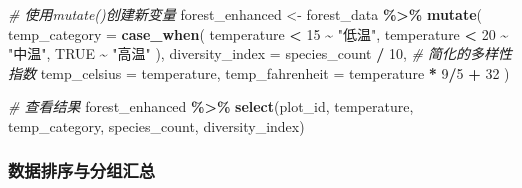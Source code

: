 \documentclass[
]{book}
\newenvironment{Shaded}{\begin{snugshade}}{\end{snugshade}}
\newcommand{\AttributeTok}[1]{\textcolor[rgb]{0.13,0.29,0.53}{#1}}
\newcommand{\CommentTok}[1]{\textcolor[rgb]{0.56,0.35,0.01}{\textit{#1}}}
\newcommand{\ConstantTok}[1]{\textcolor[rgb]{0.56,0.35,0.01}{#1}}
\newcommand{\DecValTok}[1]{\textcolor[rgb]{0.00,0.00,0.81}{#1}}
\newcommand{\FunctionTok}[1]{\textcolor[rgb]{0.13,0.29,0.53}{\textbf{#1}}}
\newcommand{\NormalTok}[1]{#1}
\newcommand{\OtherTok}[1]{\textcolor[rgb]{0.56,0.35,0.01}{#1}}
\newcommand{\SpecialCharTok}[1]{\textcolor[rgb]{0.81,0.36,0.00}{\textbf{#1}}}
\newcommand{\StringTok}[1]{\textcolor[rgb]{0.31,0.60,0.02}{#1}}
\begin{document}
\begin{Shaded}
\begin{Highlighting}[]
\CommentTok{\# 使用mutate()创建新变量}
\NormalTok{forest\_enhanced }\OtherTok{\textless{}{-}}\NormalTok{ forest\_data }\SpecialCharTok{\%\textgreater{}\%}
  \FunctionTok{mutate}\NormalTok{(}
    \AttributeTok{temp\_category =} \FunctionTok{case\_when}\NormalTok{(}
\NormalTok{      temperature }\SpecialCharTok{\textless{}} \DecValTok{15} \SpecialCharTok{\textasciitilde{}} \StringTok{"低温"}\NormalTok{,}
\NormalTok{      temperature }\SpecialCharTok{\textless{}} \DecValTok{20} \SpecialCharTok{\textasciitilde{}} \StringTok{"中温"}\NormalTok{,}
      \ConstantTok{TRUE} \SpecialCharTok{\textasciitilde{}} \StringTok{"高温"}
\NormalTok{    ),}
    \AttributeTok{diversity\_index =}\NormalTok{ species\_count }\SpecialCharTok{/} \DecValTok{10}\NormalTok{,  }\CommentTok{\# 简化的多样性指数}
    \AttributeTok{temp\_celsius =}\NormalTok{ temperature,}
    \AttributeTok{temp\_fahrenheit =}\NormalTok{ temperature }\SpecialCharTok{*} \DecValTok{9}\SpecialCharTok{/}\DecValTok{5} \SpecialCharTok{+} \DecValTok{32}
\NormalTok{  )}

\CommentTok{\# 查看结果}
\NormalTok{forest\_enhanced }\SpecialCharTok{\%\textgreater{}\%}
  \FunctionTok{select}\NormalTok{(plot\_id, temperature, temp\_category, species\_count, diversity\_index)}
\end{Highlighting}
\end{Shaded}

\hypertarget{ux6570ux636eux6392ux5e8fux4e0eux5206ux7ec4ux6c47ux603b}{%
\subsubsection{数据排序与分组汇总}\label{ux6570ux636eux6392ux5e8fux4e0eux5206ux7ec4ux6c47ux603b}}
\end{document}
